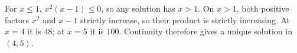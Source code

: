 For $x\le1$, $x^2(x-1)\le0$, so any solution has $x>1$. On $x>1$, both positive factors $x^2$ and $x-1$ strictly increase, so their product is strictly increasing. At $x=4$ it is $48$; at $x=5$ it is $100$. Continuity therefore gives a unique solution in $\boxed{(4,5)}$.
